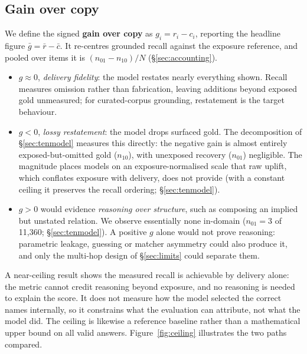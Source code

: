 \documentclass[10pt,twocolumn]{article}
\begin{document}
\subsection{Gain over copy}
We define the signed \textbf{gain over copy} as $g_i=r_i-c_i$, reporting the headline figure $\bar g=\bar r-\bar c$. It re-centres grounded recall against the exposure reference, and pooled over items it is $(n_{01}-n_{10})/N$ (\S\ref{sec:accounting}).
\begin{itemize}[topsep=2pt,itemsep=1pt,leftmargin=1.4em]
\item $g\approx0$, \emph{delivery fidelity}: the model restates nearly everything shown. Recall measures omission rather than fabrication, leaving additions beyond exposed gold unmeasured; for curated-corpus grounding, restatement is the target behaviour.
\item $g<0$, \emph{lossy restatement}: the model drops surfaced gold. The decomposition of \S\ref{sec:tenmodel} measures this directly: the negative gain is almost entirely exposed-but-omitted gold ($n_{10}$), with unexposed recovery ($n_{01}$) negligible. The magnitude places models on an exposure-normalised scale that raw uplift, which conflates exposure with delivery, does not provide (with a constant ceiling it preserves the recall ordering; \S\ref{sec:tenmodel}).
\item $g>0$ would evidence \emph{reasoning over structure}, such as composing an implied but unstated relation. We observe essentially none in-domain ($n_{01}=3$ of 11{,}360; \S\ref{sec:tenmodel}). A positive $g$ alone would not prove reasoning: parametric leakage, guessing or matcher asymmetry could also produce it, and only the multi-hop design of \S\ref{sec:limits} could separate them.
\end{itemize}
A near-ceiling result shows the measured recall is achievable by delivery alone: the metric cannot credit reasoning beyond exposure, and no reasoning is needed to explain the score. It does not measure how the model selected the correct names internally, so it constrains what the evaluation can attribute, not what the model did. The ceiling is likewise a reference baseline rather than a mathematical upper bound on all valid answers. Figure~\ref{fig:ceiling} illustrates the two paths compared.


\end{document}
